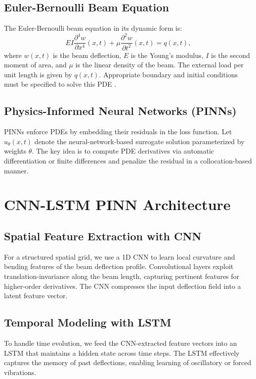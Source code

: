 \documentclass[Journal,letterpaper]{ascelike-new}
\begin{document}
\subsection{Euler-Bernoulli Beam Equation}
The Euler-Bernoulli beam equation in its dynamic form is:
\begin{equation}
EI \frac{\partial^4 w}{\partial x^4}(x,t) + \mu \frac{\partial^2 w}{\partial t^2}(x,t) = q(x,t),
\end{equation}
where $w(x,t)$ is the beam deflection, $E$ is the Young's modulus, $I$ is the second moment of area, and $\mu$ is the linear density of the beam. The external load per unit length is given by $q(x,t)$. Appropriate boundary and initial conditions must be specified to solve this PDE \cite{timoshenko1959theory}.

\subsection{Physics-Informed Neural Networks (PINNs)}
PINNs enforce PDEs by embedding their residuals in the loss function. Let $u_\theta(x,t)$ denote the neural-network-based surrogate solution parameterized by weights $\theta$. The key idea is to compute PDE derivatives via automatic differentiation \cite{raissi2019physics} or finite differences and penalize the residual in a collocation-based manner.

\section{CNN-LSTM PINN Architecture}

\subsection{Spatial Feature Extraction with CNN}
For a structured spatial grid, we use a 1D CNN to learn local curvature and bending features of the beam deflection profile. Convolutional layers exploit translation-invariance along the beam length, capturing pertinent features for higher-order derivatives. The CNN compresses the input deflection field into a latent feature vector.

\subsection{Temporal Modeling with LSTM}
To handle time evolution, we feed the CNN-extracted feature vectors into an LSTM \cite{hochreiter1997long} that maintains a hidden state across time steps. The LSTM effectively captures the memory of past deflections, enabling learning of oscillatory or forced vibrations.
\end{document}
